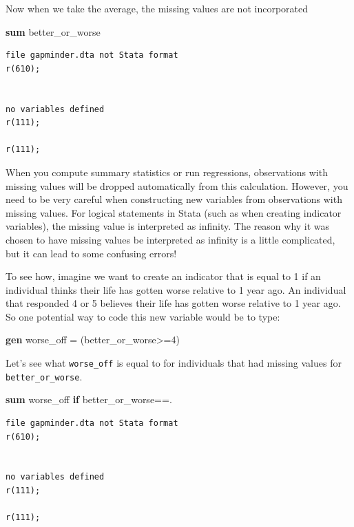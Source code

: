 \documentclass[
]{book}
\newenvironment{Shaded}{\begin{snugshade}}{\end{snugshade}}
\newcommand{\KeywordTok}[1]{\textcolor[rgb]{0.13,0.29,0.53}{\textbf{#1}}}
\newcommand{\NormalTok}[1]{#1}
\begin{document}
Now when we take the average, the missing values are not incorporated

\begin{Shaded}
\begin{Highlighting}[]
\KeywordTok{sum}\NormalTok{ better\_or\_worse}
\end{Highlighting}
\end{Shaded}

\begin{verbatim}
file gapminder.dta not Stata format
r(610);


no variables defined
r(111);

r(111);
\end{verbatim}

When you compute summary statistics or run regressions, observations with missing values will be dropped automatically from this calculation. However, you need to be very careful when constructing new variables from observations with missing values. For logical statements in Stata (such as when creating indicator variables), the missing value is interpreted as infinity. The reason why it was chosen to have missing values be interpreted as infinity is a little complicated, but it can lead to some confusing errors!

To see how, imagine we want to create an indicator that is equal to 1 if an individual thinks their life has gotten worse relative to 1 year ago. An individual that responded 4 or 5 believes their life has gotten worse relative to 1 year ago. So one potential way to code this new variable would be to type:

\begin{Shaded}
\begin{Highlighting}[]
\KeywordTok{gen}\NormalTok{ worse\_off = (better\_or\_worse\textgreater{}=4)}
\end{Highlighting}
\end{Shaded}

Let's see what \texttt{worse\_off} is equal to for individuals that had missing values for \texttt{better\_or\_worse}.

\begin{Shaded}
\begin{Highlighting}[]
\KeywordTok{sum}\NormalTok{ worse\_off }\KeywordTok{if}\NormalTok{ better\_or\_worse==.}
\end{Highlighting}
\end{Shaded}

\begin{verbatim}
file gapminder.dta not Stata format
r(610);


no variables defined
r(111);

r(111);
\end{verbatim}
\end{document}
